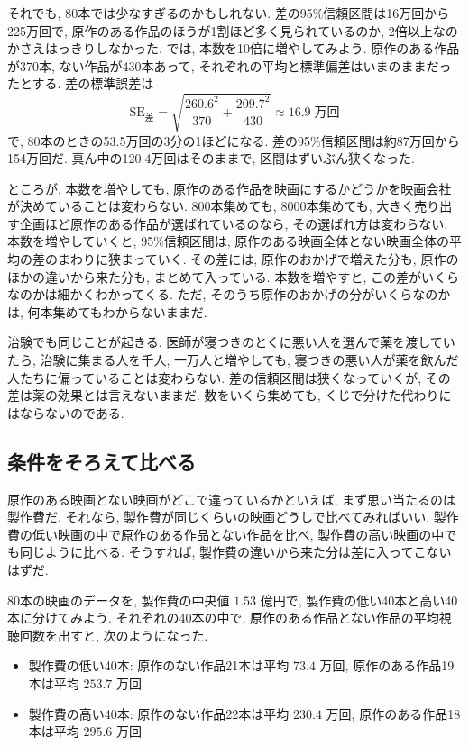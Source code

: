     それでも, 80本では少なすぎるのかもしれない.
    差の95\%信頼区間は16万回から225万回で, 原作のある作品のほうが1割ほど多く見られているのか, 2倍以上なのかさえはっきりしなかった.
    では, 本数を10倍に増やしてみよう.
    原作のある作品が370本, ない作品が430本あって, それぞれの平均と標準偏差はいまのままだったとする.
    差の標準誤差は
    \[ \mathrm{SE}_{\text{差}} = \sqrt{\frac{260.6^2}{370} + \frac{209.7^2}{430}} \approx 16.9\;\text{万回} \]
    で, 80本のときの53.5万回の3分の1ほどになる.
    差の95\%信頼区間は約87万回から154万回だ.
    真ん中の120.4万回はそのままで, 区間はずいぶん狭くなった.

    ところが, 本数を増やしても, 原作のある作品を映画にするかどうかを映画会社が決めていることは変わらない.
    800本集めても, 8000本集めても, 大きく売り出す企画ほど原作のある作品が選ばれているのなら, その選ばれ方は変わらない.
    本数を増やしていくと, 95\%信頼区間は, 原作のある映画全体とない映画全体の平均の差のまわりに狭まっていく.
    その差には, 原作のおかげで増えた分も, 原作のほかの違いから来た分も, まとめて入っている.
    本数を増やすと, この差がいくらなのかは細かくわかってくる.
    ただ, そのうち原作のおかげの分がいくらなのかは, 何本集めてもわからないままだ.

    治験でも同じことが起きる.
    医師が寝つきのとくに悪い人を選んで薬を渡していたら, 治験に集まる人を千人, 一万人と増やしても, 寝つきの悪い人が薬を飲んだ人たちに偏っていることは変わらない.
    差の信頼区間は狭くなっていくが, その差は薬の効果とは言えないままだ.
    数をいくら集めても, くじで分けた代わりにはならないのである.

  \subsection{条件をそろえて比べる}

    原作のある映画とない映画がどこで違っているかといえば, まず思い当たるのは製作費だ.
    それなら, 製作費が同じくらいの映画どうしで比べてみればいい.
    製作費の低い映画の中で原作のある作品とない作品を比べ, 製作費の高い映画の中でも同じように比べる.
    そうすれば, 製作費の違いから来た分は差に入ってこないはずだ.

    80本の映画のデータを, 製作費の中央値 $1.53$ 億円で, 製作費の低い40本と高い40本に分けてみよう.
    それぞれの40本の中で, 原作のある作品とない作品の平均視聴回数を出すと, 次のようになった.

    \begin{itemize}
      \item 製作費の低い40本: 原作のない作品21本は平均 $73.4$ 万回, 原作のある作品19本は平均 $253.7$ 万回
      \item 製作費の高い40本: 原作のない作品22本は平均 $230.4$ 万回, 原作のある作品18本は平均 $295.6$ 万回
    \end{itemize}

